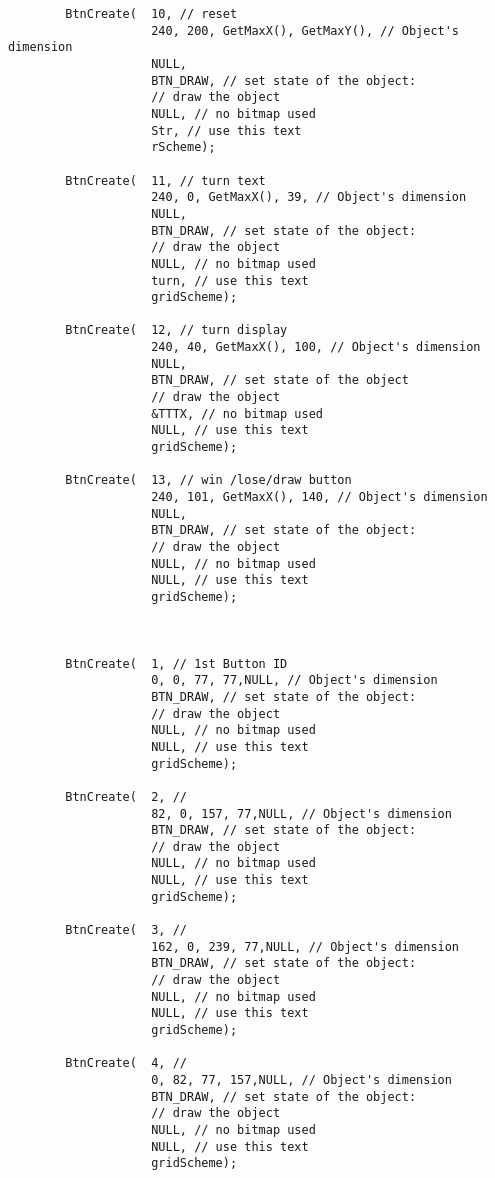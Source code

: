 \documentclass[12pt]{article}
\begin{document}
\begin{lstlisting}
        BtnCreate(  10, // reset
			        240, 200, GetMaxX(), GetMaxY(), // Object's dimension
			        NULL,
			        BTN_DRAW, // set state of the object:
			        // draw the object
			        NULL, // no bitmap used
			        Str, // use this text
			        rScheme);

        BtnCreate(  11, // turn text
			        240, 0, GetMaxX(), 39, // Object's dimension
			        NULL,
        			BTN_DRAW, // set state of the object:
			        // draw the object
			        NULL, // no bitmap used
			        turn, // use this text
			        gridScheme);

        BtnCreate(  12, // turn display
			        240, 40, GetMaxX(), 100, // Object's dimension
			        NULL,
			        BTN_DRAW, // set state of the object
			        // draw the object
			        &TTTX, // no bitmap used
			        NULL, // use this text
			        gridScheme);

        BtnCreate(  13, // win /lose/draw button
			        240, 101, GetMaxX(), 140, // Object's dimension
			        NULL,
			        BTN_DRAW, // set state of the object:
			        // draw the object
			        NULL, // no bitmap used
			        NULL, // use this text
			        gridScheme);



        BtnCreate(  1, // 1st Button ID
                    0, 0, 77, 77,NULL, // Object's dimension
                    BTN_DRAW, // set state of the object:
                    // draw the object
                    NULL, // no bitmap used
                    NULL, // use this text
                    gridScheme);

        BtnCreate(  2, //
                    82, 0, 157, 77,NULL, // Object's dimension
                    BTN_DRAW, // set state of the object:
                    // draw the object
                    NULL, // no bitmap used
                    NULL, // use this text
                    gridScheme);

        BtnCreate(  3, // 
                    162, 0, 239, 77,NULL, // Object's dimension
                    BTN_DRAW, // set state of the object:
                    // draw the object
                    NULL, // no bitmap used
                    NULL, // use this text
                    gridScheme);

        BtnCreate(  4, // 
                    0, 82, 77, 157,NULL, // Object's dimension
                    BTN_DRAW, // set state of the object:
                    // draw the object
                    NULL, // no bitmap used
                    NULL, // use this text
                    gridScheme);


\end{lstlisting}
\end{document}
